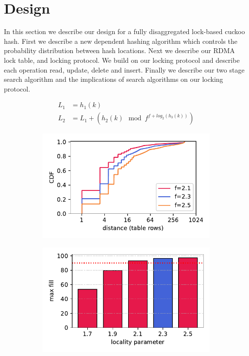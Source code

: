 \section{Design}

In this section we describe our design for a fully
disaggregated lock-based cuckoo hash. First we describe a
new dependent hashing algorithm which controls the
probability distribution between hash locations. Next we
describe our RDMA lock table, and locking protocol. We build
on our locking protocol and describe each operation read,
update, delete and insert. Finally we describe our two stage
search algorithm and the implications of search algorithms
on our locking protocol.


\label{sec:design}

\begin{figure}[t]
    \centering
    \begin{subfigure}{0.3\linewidth}
        \begin{align*}
            L_1 &= h_1(k) \\
            L_2 &= L_1 + (h_2(k)\mod f^{f + log_2(h_3(k))})
        \end{align*}
    \end{subfigure}
    \begin{subfigure}{0.3\linewidth}
        \includegraphics[width=0.99\linewidth]{fig/hash_factor.pdf}
    \end{subfigure}
    \begin{subfigure}{0.3\linewidth}
        \includegraphics[width=0.99\linewidth]{fig/hash_fill.pdf}

\end{subfigure}
\end{figure}

